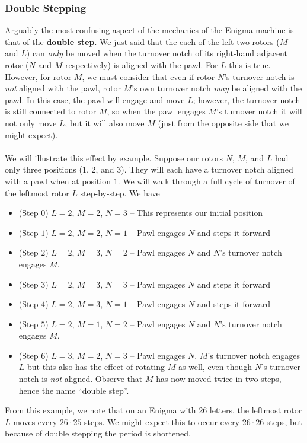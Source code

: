 \subsubsection{Double Stepping}\label{double_step}
Arguably the most confusing aspect of the mechanics of the Enigma
machine is that of the {\bf{double step}}. We just said that the each
of the left two rotors ($M$ and $L$) can \emph{only} be moved when
the turnover notch of its right-hand adjacent rotor ($N$ and $M$
respectively) is aligned with the pawl. For $L$ this is true.
However, for rotor $M$, we must consider that even if rotor $N$'s
turnover notch is \emph{not} aligned with the pawl, rotor $M$'s own
turnover notch \emph{may} be aligned with the pawl. In this case, the
pawl will engage and move $L$; however, the turnover notch is still
connected to rotor $M$, so when the pawl engages $M$'s turnover notch
it will not only move $L$, but it will also move $M$ (just from the
opposite side that we might expect).
\\\\We will illustrate this effect by example. Suppose our rotors
$N$, $M$, and $L$ had only three positions ($1$, $2$, and $3$). They
will each have a turnover notch aligned with a pawl when at position
$1$. We will walk through a full cycle of turnover of the leftmost
rotor $L$ step-by-step. We have
\begin{itemize}
  \item (Step $0$) $L = 2$, $M = 2$, $N = 3$ -- This represents our
    initial position
  \item (Step $1$) $L = 2$, $M = 2$, $N = 1$ -- Pawl engages $N$ and
    steps it forward
  \item (Step $2$) $L = 2$, $M = 3$, $N = 2$ -- Pawl engages $N$ and
    $N$'s turnover notch engages $M$.
  \item (Step $3$) $L = 2$, $M = 3$, $N = 3$ -- Pawl engages $N$ and
    steps it forward
  \item (Step $4$) $L = 2$, $M = 3$, $N = 1$ -- Pawl engages $N$ and
    steps it forward
  \item (Step $5$) $L = 2$, $M = 1$, $N = 2$ -- Pawl engages $N$ and
    $N$'s turnover notch engages $M$.
  \item (Step $6$) $L = 3$, $M = 2$, $N = 3$ -- Pawl engages $N$.
    $M$'s turnover notch engages $L$ but this also has the effect of
    rotating $M$ as well, even though $N$'s turnover notch is
    \emph{not} aligned. Observe that $M$ has now moved twice in two
    steps, hence the name ``double step''.
\end{itemize}
From this example, we note that on an Enigma with 26 letters, the
leftmost rotor $L$
moves every $26\cdot25$ steps. We might expect this to occur every
$26\cdot26$ steps, but
because of double stepping the period is shortened.
